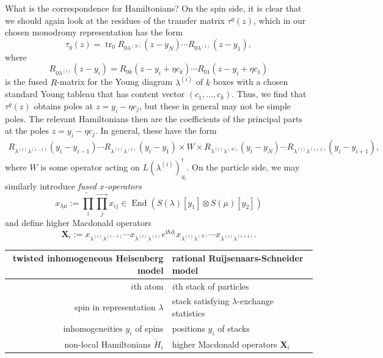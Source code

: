 \documentclass[11pt]{report}
\theoremstyle{definition}
\theoremstyle{remark}
\theoremstyle{remark}
\newcommand{\I}{\mathrm{i}}
\begin{document}
What is the correspondence for Hamiltonians? On the spin side, it is clear that we should again look at the residues of the transfer matrix $\tau^g(z)$, which in our chosen monodromy representation has the form
\begin{equation*}
\tau_g(z) = \operatorname{tr}_0 R_{0\lambda^{(N)}}(z-y_N) \cdots R_{0\lambda^{(1)}}(z-y_1),
\end{equation*}
where
\begin{equation*}
R_{0\lambda^{(i)}}(z-y_i) = R_{0k}(z-y_i+\eta c_k) \cdots R_{01}(z-y_i+\eta c_1)
\end{equation*}
is the fused $R$-matrix for the Young diagram $\lambda^{(i)}$ of $k$ boxes with a chosen standard Young tableau that has content vector $(c_1,...,c_k)$. Thus, we find that $\tau^g(z)$ obtains poles at $z = y_i-\eta c_j$, but these in general may not be simple poles. The relevant Hamiltonians then are the coefficients of the principal parts at the poles $z = y_i-\eta c_j$. In general, these have the form
\begin{align*}
R_{\lambda^{(i)}\lambda^{(i-1)}}(y_i-y_{i-1}) \cdots R_{\lambda^{(i)}\lambda^{(1)}}(y_i-y_1) \times W \times R_{\lambda^{(i)}\lambda^{(N)}}(y_i-y_N) \cdots R_{\lambda^{(i)}\lambda^{(i+1)}}(y_i-y_{i+1}),
\end{align*}
where $W$ is some operator acting on $L(\lambda^{(i)})_{y_i}^t$. On the particle side, we may similarly introduce \emph{fused $x$-operators}
\begin{equation*}
x_{\lambda \mu} := \overleftarrow{\prod_i} \overrightarrow{\prod_j} x_{ij} \in \operatorname{End}(S(\lambda)[y_1] \otimes S(\mu)[y_2])
\end{equation*}
and define higher Macdonald operators
\begin{equation*}
\mathbf{X}_i := x_{\lambda^{(i)}\lambda^{(i-1)}} \cdots x_{\lambda^{(i)}\lambda^{(1)}} e^{\I\hbar\partial_i} x_{\lambda^{(i)}\lambda^{(N)}} \cdots x_{\lambda^{(i)}\lambda^{(i+1)}}.
\end{equation*}

\begin{center}
\begin{tabular}{|r||l|}
\hline
twisted inhomogeneous Heisenberg model & rational Ruijsenaars-Schneider model \\
\hline
$i$th atom & $i$th stack of particles \\
spin in representation $\lambda$ & stack satisfying $\lambda$-exchange statistics \\
inhomogeneities $y_i$ of spins & positions $y_i$ of stacks \\
non-local Hamiltonians $\check H_i$ & higher Macdonald operators $\mathbf{X}_i$ \\
\hline
\end{tabular}
\end{center}
\end{document}

